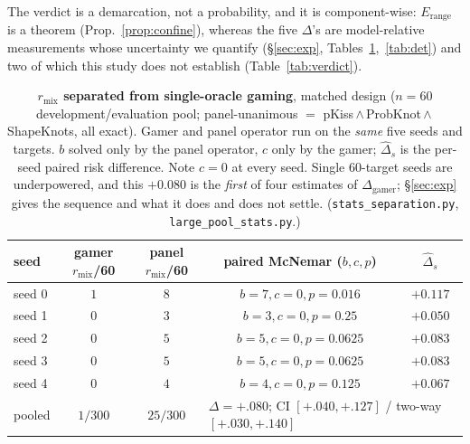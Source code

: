 \documentclass[11pt]{article}
\begin{document}
\noindent The verdict is a demarcation, not a probability, and it is component-wise:
$E_{\mathrm{range}}$ is a theorem (Prop.~\ref{prop:confine}), whereas the five $\Delta$'s are model-relative
measurements whose uncertainty we quantify (\S\ref{sec:exp}, Tables~\ref{tab:sep},~\ref{tab:det}) and two of
which this study does not establish (Table~\ref{tab:verdict}).

\begin{table}[t]\centering\small
\setlength{\tabcolsep}{4.5pt}\renewcommand{\arraystretch}{1.15}
\caption{\textbf{$r_{\mathrm{mix}}$ separated from single-oracle gaming}, matched design ($n{=}60$
development/evaluation pool; panel-unanimous $=$ pKiss\,$\wedge$\,ProbKnot\,$\wedge$\,ShapeKnots, all exact).
Gamer and panel operator run on the \emph{same} five seeds and targets. $b$ solved only by the panel operator,
$c$ only by the gamer; $\widehat\Delta_s$ is the per-seed paired risk difference. Note $c{=}0$ at every seed.
Single $60$-target seeds are underpowered, and this ${+}0.080$ is the \emph{first} of four estimates of
$\Delta_{\mathrm{gamer}}$; \S\ref{sec:exp} gives the sequence and what it does and does not settle.
(\texttt{stats\_separation.py}, \texttt{large\_pool\_stats.py}.)}\label{tab:sep}
\begin{tabularx}{\linewidth}{@{}Xcccc@{}}
\toprule
\textbf{seed} & \textbf{gamer $r_{\mathrm{mix}}$/60} & \textbf{panel $r_{\mathrm{mix}}$/60} & \textbf{paired McNemar ($b,c,p$)} & $\widehat\Delta_s$\\
\midrule
seed 0 & $1$ & $8$ & $b{=}7,c{=}0,p{=}0.016$ & $+0.117$\\
seed 1 & $0$ & $3$ & $b{=}3,c{=}0,p{=}0.25$ & $+0.050$\\
seed 2 & $0$ & $5$ & $b{=}5,c{=}0,p{=}0.0625$ & $+0.083$\\
seed 3 & $0$ & $5$ & $b{=}5,c{=}0,p{=}0.0625$ & $+0.083$\\
seed 4 & $0$ & $4$ & $b{=}4,c{=}0,p{=}0.125$ & $+0.067$\\
\midrule
pooled & $1/300$ & $25/300$ & \multicolumn{2}{l}{$\Delta{=}{+}.080$; CI $[{+}.040,{+}.127]$ / two-way $[{+}.030,{+}.140]$}\\
\bottomrule
\end{tabularx}
\end{table}
\end{document}
